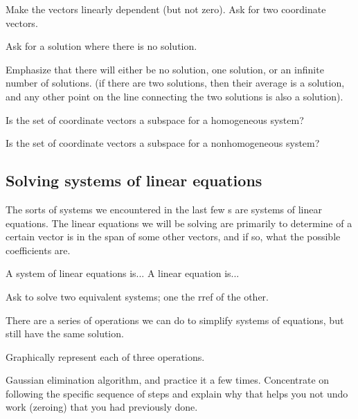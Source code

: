 \begin{problemtodo}
  Make the vectors linearly dependent (but not zero).  Ask for two coordinate vectors.
\end{problemtodo}

\begin{problemtodo}
  Ask for a solution where there is no solution.
\end{problemtodo}

Emphasize that there will either be no solution, one solution, or an
infinite number of solutions. (if there are two solutions, then their
average is a solution, and any other point on the line connecting the
two solutions is also a solution).

\begin{problemtodo}
  Is the set of coordinate vectors a subspace for a homogeneous
  system?
\end{problemtodo}

\begin{problemtodo}
  Is the set of coordinate vectors a subspace for a nonhomogeneous system?
\end{problemtodo}

\subsection{Solving systems of linear equations}
\label{sec:solv-syst-line}
The sorts of systems we encountered in the last few \prob{}s are
systems of linear equations.  The linear equations we will be solving
are primarily to determine of a certain vector is in the span of some
other vectors, and if so, what the possible coefficients are.

\begin{definition}
  A system of linear equations is...  A linear equation is...
\end{definition}

\begin{problemtodo}
  Ask to solve two equivalent systems; one the rref of the other.
\end{problemtodo}

There are a series of operations we can do to simplify systems of
equations, but still have the same solution.

\begin{problemtodo}
  Graphically represent each of three operations.
\end{problemtodo}

Gaussian elimination algorithm, and practice it a few times.
Concentrate on following the specific sequence of steps and explain
why that helps you not undo work (zeroing) that you had previously done.

